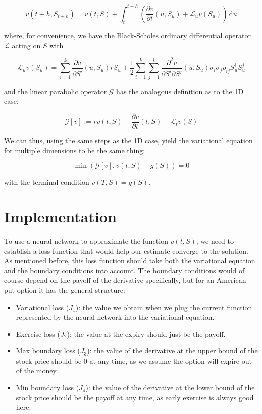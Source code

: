 \[
v(t+h, S_{t+h})= v(t, S) + \int_t^{t+h} \left(\frac{\partial v}{\partial t}(u, S_u) + \mathcal L_u v(S_u)\right)\,\mathrm du
\]

where, for convenience, we have the Black-Scholes ordinary differential operator $\mathcal L$ acting on $S$ with

\[
\mathcal L_uv(S_u) = \sum_{i=1}^k\frac{\partial v}{\partial S^i}(u, S_u)rS_u + \frac 12 \sum_{i=1}^k\sum_{j=1}^k \frac{\partial^2 v}{\partial S^i\partial S^j}(u, S_u) \sigma_i\sigma_j \rho_{ij} S^i_uS^j_u
\]

and the linear parabolic operator $\mathcal G$ has the analogous definition as to the 1D case:

\[\mathcal G[v]:= rv(t, S) - \frac{\partial v}{\partial t}(t, S) - \mathcal L_tv(S)\]

We can thus, using the same steps as the 1D case, yield the variational equation for multiple dimensions to be the same thing:

\[
\min\left(\mathcal G[v], v(t, S)  - g(S)\right) = 0
\]

with the terminal condition $v(T, S) = g(S)$.


\section{Implementation}

To use a neural network to approximate the function $v(t, S)$, we need to establish a loss function that would help our estimate converge to the solution. As mentioned before, this loss function should take both the variational equation and the boundary conditions into account. The boundary conditions would of course depend on the payoff of the derivative specifically, but for an American put option it has the general structure:

\begin{itemize}
    \item Variational loss ($J_1$): the value we obtain when we plug the current function represented by the neural network into the variational equation.
    \item Exercise loss ($J_2$): the value at the expiry should just be the payoff.
    \item Max boundary loss ($J_3$): the value of the derivative at the upper bound of the stock price should be $0$ at any time, as we assume the option will expire out of the money.
    \item Min boundary loss ($J_4$): the value of the derivative at the lower bound of the stock price should be the payoff at any time, as early exercise is always good here.
\end{itemize}

